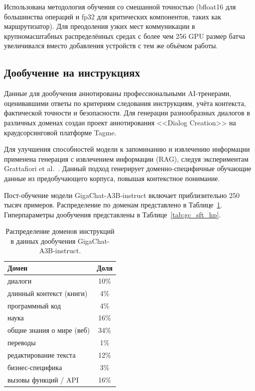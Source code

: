Использована методология обучения со смешанной точностью (bfloat16 для большинства операций и fp32 для критических компонентов, таких как маршрутизатор). Для преодоления узких мест коммуникации в крупномасштабных распределённых средах с более чем 256 GPU размер батча увеличивался вместо добавления устройств с тем же объёмом работы.

\subsection{Дообучение на инструкциях}\label{subsec:gc_posttrain}

Данные для дообучения аннотированы профессиональными AI-тренерами, оценивавшими ответы по критериям следования инструкциям, учёта контекста, фактической точности и безопасности. Для генерации разнообразных диалогов в различных доменах создан проект аннотирования <<Dialog Creation>> на краудсорсинговой платформе Tagme.

Для улучшения способностей модели к запоминанию и извлечению информации применена генерация с извлечением информации (RAG), следуя экспериментам Grattafiori et al.~\cite{grattafiori2024llama3}. Данный подход генерирует доменно-специфичные обучающие данные из предобучающего корпуса, повышая контекстное понимание.

Пост-обучение модели GigaChat-A3B-instruct включает приблизительно 250 тысяч примеров. Распределение по доменам представлено в Таблице~\ref{tab:gc_sft_data}. Гиперпараметры дообучения представлены в Таблице~\ref{tab:gc_sft_hp}.

\begin{table}[H]
    \centering
    \caption{Распределение доменов инструкций в данных дообучения GigaChat-A3B-instruct.}
    \label{tab:gc_sft_data}
    \begin{tabular}{lc}
        \toprule
        Домен & Доля \\
        \midrule
        диалоги                   & 10\% \\
        длинный контекст (книги)  & 4\%  \\
        программный код           & 4\%  \\
        наука                     & 16\% \\
        общие знания о мире (веб) & 34\% \\
        переводы                  & 1\%  \\
        редактирование текста     & 12\% \\
        бизнес-специфика          & 3\%  \\
        вызовы функций / API      & 16\% \\
        \bottomrule
    \end{tabular}
\end{table}


